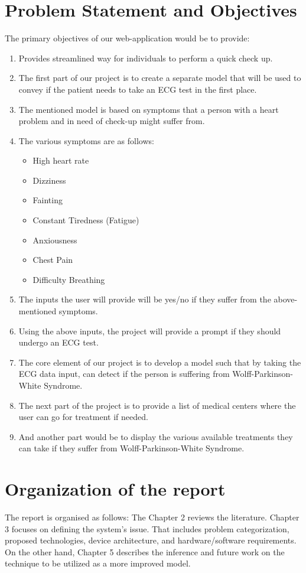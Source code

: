 \section{Problem Statement and Objectives}
The primary objectives of our web-application would be to provide:  
\begin{enumerate}
	\item Provides streamlined way for individuals to perform a quick check up. 
	\item The first part of our project is to create a separate model that will be used to convey if the patient needs to take an ECG test in the first place.
	\item The mentioned model is based on symptoms that a person with a heart problem and in need of check-up might suffer from. 
	\item The various symptoms are as follows: 
	\begin{itemize}
		\item High heart rate 
		\item Dizziness 
		\item Fainting 
		\item Constant Tiredness (Fatigue) 
		\item Anxiousness			 
		\item Chest Pain 
		\item Difficulty Breathing
	\end{itemize}
	\item The inputs the user will provide will be yes/no if they suffer from the above-mentioned symptoms. 
	\item Using the above inputs, the project will provide a prompt if they should undergo an ECG test. 
	\item The core element of our project is to develop a model such that by taking the ECG data input, can detect if the person is suffering from Wolff-Parkinson-White Syndrome. 
	\item The next part of the project is to provide a list of medical centers where the user can go for treatment if needed. 
	\item And another part would be to display the various available treatments they can take if they suffer from Wolff-Parkinson-White Syndrome.
	 
	
\end{enumerate}

\section{Organization of the report}

The report is organised as follows: The Chapter 2 reviews the literature. Chapter 3 focuses on defining the system's issue. That includes problem categorization, proposed technologies, device architecture, and hardware/software requirements. On the other hand, Chapter 5 describes the inference and future work on the technique to be utilized as a more improved model.
